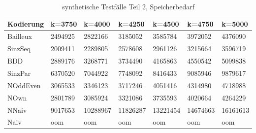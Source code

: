 \documentclass[a4,abstract=on]{scrartcl}
\begin{document}
\begin{landscape}
\begin{table}[h!]
    \small
    \setlength{\tabcolsep}{0.11cm}
     \centering
     \begin{tabular}[width=\textwidth]{|l||l|l|l|l|l|l|}
	\hline
       \textbf{Kodierung} &\textbf{k=3750} &\textbf{k=4000} &\textbf{k=4250} &\textbf{k=4500} &\textbf{k=4750} &\textbf{k=5000}\\
	\hline
	\hline
 Bailleux & 2494925 & 2822166 & 3185052 & 3585784 & 3972052 & 4376090\\
\hline
SinzSeq  & 2009411 & 2289805 & 2578608 & 2961126 & 3215664 & 3596719\\
\hline
BDD & 2889176 & 3268771 & 3734490 & 4165863 & 4550542 & 5099838\\
\hline
SinzPar & 6370520 & 7044922 & 7748092 & 8416433 & 9085946 & 9879617\\
\hline
NOddEven & 3065533 & 3346123 & 3717246 & 4051416 & 4314980 & 4718988\\
\hline
NOwn  & 2801789 & 3085924 & 3321086 & 3735593 & 4020664 & 4264229\\
\hline
NNaiv & 9017653 & 10288967 & 11826287 & 13221454 & 14674663 & 16161613\\
\hline
Naiv  & oom & oom & oom & oom & oom & oom\\
\hline

 \end{tabular}

     \caption{synthetische Testfälle Teil 2, Speicherbedarf}
     \label{tbl:beispieltabelle}

   \end{table}
	

\end{landscape}	
\end{document}
